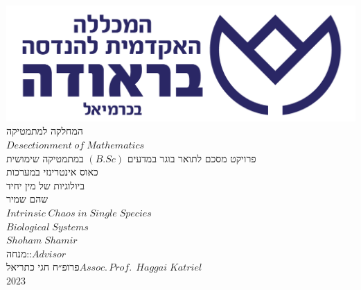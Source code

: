 \documentclass{article}
\begin{document}
\begin{center}
    \includegraphics[scale=0.15]{figs/braude.png}\\\smallskip
    \textcolor{braude}{המחלקה למתמטיקה\\\vspace{1.5mm}\(Desectionment\;of\;Mathematics\)}\\\vspace{20mm}
    {\large פרויקט מסכם לתואר בוגר במדעים \(\left(B.Sc\right)\) במתמטיקה שימושית}\\\vspace{23mm}
    {\LARGE כאוס אינטרינזי במערכות\\ביולוגיות של מין יחיד}\\\medskip
    {\large שהם שמיר}\\\vspace{9mm}
    {\LARGE \(Intrinsic\;Chaos\;in\;Single\;Species\)\\\(Biological\;Systems\)}\\\medskip
    {\large  \(Shoham\;Shamir\)}\\\vspace{30mm}
    מנחה:\hfill :\(Advisor\)\\
    פרופ״ח חגי כתריאל\hfill \(Assoc.\,Prof.\:\:Haggai\;Katriel\)\\\vfill
    \(2023\)
\end{center}
\thispagestyle{empty}
\newpage
\begin{abstract}
\noindent במסגרת עבודת גמר זו נסקור מערכת ביולוגית של אוכלוסיית מין
יחיד חד-תאית המצויה תחת תנאים מיטיבים, הכוללים מזון וללא הימצאותם
של מינים טורפים אחרים.\\

\noindent ההנחה הטבעית של השכל הישר היא כי במצב שכזה, כמות הפריטים באוכלוסיה
תגדל עד אשר תגיע לאיזון שבין כמות הפריטים המתווספים למערכת לאלו היוצאים
ממנה. אולם, עבור טווח ערכים של פרמטרים במערכת הנחקרת נראה כי לא כך
המצב והמערכת תִתְיַצֵּג על מנעד רחב של התנהגויות.\\
מנעד רחב זה ינוע החל מהיכחדותה של האוכלוסיה, דרך התייצבות על-פי מחזוריות
מסוימת ועד הִוצרות של התנהגות כאוטית ללא אפשרות חיזוי — אך עם אפשרות
לתובנות בתחומי הביולוגיה והרפואה.\\

\noindent בארבעת הפרקים בעבודה זו נציג את הרקע ההיסטורי והתפתחות תחום
תורת הכאוס, נבאר את המֹודל המוצע, ונפתח שיטות להוכחת הכאוטיות ואפיון
המערכת. בסיכום נתייחס לקושי ולחשיבות שבאפיון מערכות כאלו עם יישומיות
להמשך.
\end{abstract}
\setcounter{page}{1}
\newpage
\tableofcontents
\newpage
\end{document}
